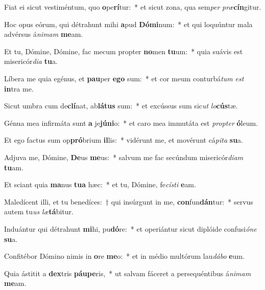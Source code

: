 \item Fiat ei sicut vestiméntum, quo \textbf{o}pe\textbf{rí}tur:~* et sicut zona, qua sem\textit{per} \textit{præ}\textbf{cín}gitur.
\item Hoc opus eórum, qui détrahunt mihi \textbf{a}pud \textbf{Dó}\textbf{mi}num:~* et qui loquúntur mala advérsus á\textit{ni}\textit{mam} \textbf{me}am.
\item Et tu, Dómine, Dómine, fac mecum propter \textbf{no}men \textbf{tu}um:~* quia suávis est misericór\textit{di}\textit{a} \textbf{tu}a.
\item Líbera me quia egénus, et \textbf{pau}per \textbf{e}\textbf{go} sum:~* et cor meum conturbá\textit{tum} \textit{est} \textbf{in}tra me.
\item Sicut umbra cum de\textbf{clí}nat, ab\textbf{lá}\textbf{tus} sum:~* et excússus sum sic\textit{ut} \textit{lo}\textbf{cús}tæ.
\item Génua mea infirmáta sunt \textbf{a} je\textbf{jú}\textbf{ni}o:~* et caro mea immutáta est \textit{prop}\textit{ter} \textbf{ó}leum.
\item Et ego factus sum op\textbf{pró}brium \textbf{il}lis:~* vidérunt me, et movérunt cá\textit{pi}\textit{ta} \textbf{su}a.
\item Adjuva me, Dómine, \textbf{De}us \textbf{me}us:~* salvum me fac secúndum misericór\textit{di}\textit{am} \textbf{tu}am.
\item Et sciant quia \textbf{ma}nus \textbf{tu}\textbf{a} hæc:~* et tu, Dómine, fe\textit{cís}\textit{ti} \textbf{e}am.
\item Maledícent illi, et tu benedíces:~† qui insúrgunt in me, \textbf{con}fun\textbf{dán}tur:~* servus autem tu\textit{us} \textit{læ}\textbf{tá}bitur.
\item Induántur qui détrahunt \textbf{mi}hi, pu\textbf{dó}re:~* et operiántur sicut diplóide confusi\textit{ó}\textit{ne} \textbf{su}a.
\item Confitébor Dómino nimis in \textbf{o}re \textbf{me}o:~* et in médio multórum lau\textit{dá}\textit{bo} \textbf{e}um.
\item Quia ástitit a \textbf{dex}tris \textbf{páu}\textbf{pe}ris,~* ut salvam fáceret a persequéntibus á\textit{ni}\textit{mam} \textbf{me}am.
